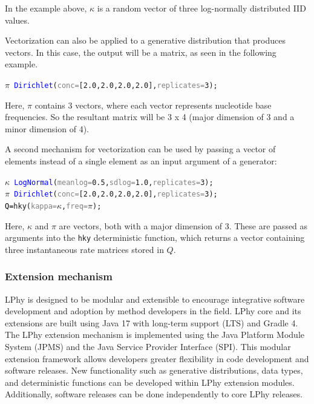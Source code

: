 \documentclass[10pt,letterpaper,table]{article}
\theoremstyle{definition}
\begin{document}
In the example above, $\kappa$ is a random vector of three log-normally distributed IID values.

Vectorization can also be applied to a generative distribution that produces vectors. In this case, the output will be a matrix, as seen in the following example. 

{\small
\begin{alltt}
      \textcolor{bluishgreen}{\(\pi\)} ~ \textcolor{blue}{Dirichlet}(\textcolor{gray}{conc=}[\textcolor{constant}{2.0}, \textcolor{constant}{2.0}, \textcolor{constant}{2.0}, \textcolor{constant}{2.0}], \textcolor{gray}{replicates=}\textcolor{constant}{3});
\end{alltt}
}
Here, $\pi$ contains 3 vectors, where each vector represents nucleotide base frequencies. 
So the resultant matrix will be 3 x 4 (major dimension of 3 and a minor dimension of 4). 

A second mechanism for vectorization can be used by passing a vector of elements instead of a single element as an input argument of a generator:

{\small
\begin{alltt}
    \textcolor{bluishgreen}{\(\kappa\)} ~ \textcolor{blue}{LogNormal}(\textcolor{gray}{meanlog=}\textcolor{constant}{0.5}, \textcolor{gray}{sdlog=}\textcolor{constant}{1.0}, \textcolor{gray}{replicates=}\textcolor{constant}{3});
    \textcolor{bluishgreen}{\(\pi\)} ~ \textcolor{blue}{Dirichlet}(\textcolor{gray}{conc=}[\textcolor{constant}{2.0}, \textcolor{constant}{2.0}, \textcolor{constant}{2.0}, \textcolor{constant}{2.0}], \textcolor{gray}{replicates=}\textcolor{constant}{3});
    \textcolor{black}{Q = }\textcolor{generator}{hky}(\textcolor{gray}{kappa=}\textcolor{bluishgreen}{\(\kappa\)}, \textcolor{gray}{freq=}\textcolor{bluishgreen}{\(\pi\)});
\end{alltt} 
}

Here, $\kappa$ and $\pi$ are vectors, both with a major dimension of 3. 
These are passed as arguments into the \texttt{hky} deterministic function, which returns a vector containing three instantaneous rate matrices stored in $Q$.

\subsubsection{Extension mechanism}
LPhy is designed to be modular and extensible to encourage integrative software development and adoption by method developers in the field. 
LPhy core and its extensions are built using Java 17 with long-term support (LTS) and Gradle 4. 
The LPhy extension mechanism is implemented using the Java Platform Module System (JPMS) and the Java Service Provider Interface (SPI).
This modular extension framework allows developers greater flexibility in code development and software releases. 
New functionality such as generative distributions, data types, and deterministic functions can be developed within LPhy extension modules. 
Additionally, software releases can be done independently to core LPhy releases. 
\end{document}
